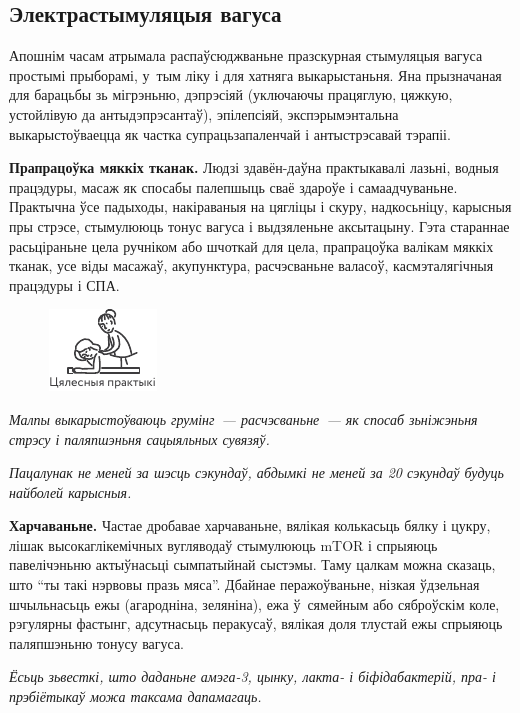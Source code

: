 \subsection*{Электрастымуляцыя вагуса}

Апошнім часам атрымала распаўсюджваньне празскурная стымуляцыя вагуса простымі прыборамі, у~тым ліку і для хатняга выкарыстаньня. Яна прызначаная для барацьбы зь мігрэньню, дэпрэсіяй (уключаючы працяглую, цяжкую, устойлівую да антыдэпрэсантаў), эпілепсіяй, экспэрымэнтальна выкарыстоўваецца як частка супрацьзапаленчай і антыстрэсавай тэрапіі.

\textbf{Прапрацоўка мяккіх тканак.} Людзі здавён-даўна практыкавалі лазьні, водныя працэдуры, масаж як спосабы палепшыць сваё здароўе і самаадчуваньне. Практычна ўсе падыходы, накіраваныя на цягліцы і скуру, надкосьніцу, карысныя пры стрэсе, стымулююць тонус вагуса і выдзяленьне аксытацыну. Гэта стараннае расьціраньне цела ручніком або шчоткай для цела, прапрацоўка валікам мяккіх тканак, усе віды масажаў, акупунктура, расчэсваньне валасоў, касмэталягічныя працэдуры і СПА. 

\begin{figure}[htb!]
  \centering
  \includegraphics[scale=1.5]{willpower/ch7/23.pdf}
\end{figure}

\emph{Малпы выкарыстоўваюць грумінг~--- расчэсваньне~--- як спосаб зьніжэньня стрэсу і паляпшэньня сацыяльных сувязяў.}

\emph{Пацалунак не меней за шэсць сэкундаў, абдымкі не меней за 20 сэкундаў будуць найболей карысныя.}

\textbf{Харчаваньне.} Частае дробавае харчаваньне, вялікая колькасьць бялку і цукру, лішак высокаглікемічных вугляводаў стымулююць mTOR і спрыяюць павелічэньню актыўнасьці сымпатыйнай сыстэмы. Таму цалкам можна сказаць, што ``ты такі нэрвовы празь мяса''. Дбайнае перажоўваньне, нізкая ўдзельная шчыльнасьць ежы (агародніна, зеляніна), ежа ў~сямейным або сяброўскім коле, рэгулярны фастынг, адсутнасьць перакусаў, вялікая доля тлустай ежы спрыяюць паляпшэньню тонусу вагуса. 

\emph{Ёсьць зьвесткі, што даданьне амэга-3, цынку, лакта- і біфідабактерій, пра- і прэбіётыкаў можа таксама дапамагаць.}

